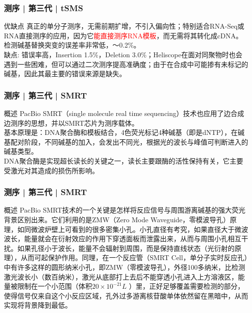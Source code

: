 \begin{frame}
  \frametitle{测序 | 第三代 | tSMS}
  \begin{block}{优缺点}
    真正的单分子测序，无需前期扩增，不引入偏向性；特别适合RNA-Seq或RNA直接测序的应用，因为它\textcolor{red}{能直接测序RNA模板}，而无需将其转化成cDNA。检测碱基替换突变的误差率非常低，～0.2\%。\\
\vspace{1em}
缺点: 错误率高，Insertion 1.5\%，Deletion 3.0\%；Heliscope在面对同聚物时也会遇到一些困难，但可以通过二次测序提高准确度；由于在合成中可能掺有未标记的碱基，因此其最主要的错误来源是缺失。
  \end{block}
\end{frame}

\begin{frame}
  \frametitle{测序 | 第三代 | \alert{SMRT}}
  \begin{block}{概述}
PacBio SMRT（single molecule real time sequencing）技术也应用了边合成边测序的思想，并以SMRT芯片为测序载体。\\
\vspace{1em}
基本原理是：DNA聚合酶和模板结合，4色荧光标记4种碱基（即是dNTP），在碱基配对阶段，不同碱基的加入，会发出不同光，根据光的波长与峰值可判断进入的碱基类型。\\
\vspace{1em}
DNA聚合酶是实现超长读长的关键之一，读长主要跟酶的活性保持有关，它主要受激光对其造成的损伤所影响。
  \end{block}
\end{frame}

\begin{frame}
  \frametitle{测序 | 第三代 | SMRT}
  \begin{block}{概述}
    PacBio SMRT技术的一个关键是怎样将反应信号与周围游离碱基的强大荧光背景区别出来。它们利用的是ZMW（Zero Mode Waveguide，零模波导孔）原理，如同微波炉壁上可看到的很多密集小孔。小孔直径有考究，如果直径大于微波波长，能量就会在衍射效应的作用下穿透面板而泄露出来，从而与周围小孔相互干扰。如果孔径小于波长，能量不会辐射到周围，而是保持直线状态（光衍射的原理），从而可起保护作用。同理，在一个反应管（SMRT Cell，单分子实时反应孔）中有许多这样的圆形纳米小孔，即ZMW（零模波导孔），外径100多纳米，比检测激光波长小（数百纳米），激光从底部打上去后不能穿透小孔进入上方溶液区，能量被限制在一个小范围（体积$20 \times 10^{-21}L$ ）里，正好足够覆盖需要检测的部分，使得信号仅来自这个小反应区域，孔外过多游离核苷酸单体依然留在黑暗中，从而实现将背景降到最低。
  \end{block}
\end{frame}

